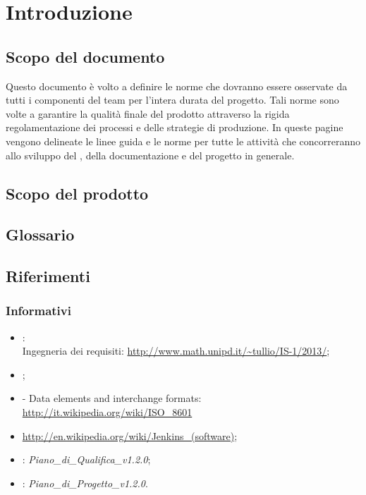 \newpage
\section{Introduzione}%
\label{1.0}
\subsection{Scopo del documento}%
\label{1.1}
Questo documento è volto a definire le norme che dovranno essere osservate da tutti i componenti del team per l'intera durata del progetto. Tali norme sono volte a garantire la qualità finale del prodotto attraverso la rigida regolamentazione dei processi e delle strategie di produzione. In queste pagine vengono delineate le linee guida e le norme per tutte le attività che concorreranno allo sviluppo del , della documentazione e del progetto in generale.

\subsection{Scopo del prodotto}
\label{1.2}
\Prodotto{}

\subsection{Glossario}%
\label{1.3}
\Glossario{}

\subsection{Riferimenti} %
\label{1.4}
\subsubsection{Informativi}
\begin{itemize}
\item {}:\\
Ingegneria dei requisiti: \url{http://www.math.unipd.it/~tullio/IS-1/2013/};
\item {};\\
\item {} - Data elements and interchange formats: \url{http://it.wikipedia.org/wiki/ISO\_8601}
\item {} \url{http://en.wikipedia.org/wiki/Jenkins_(software)};
\item {}: \emph{Piano\_di\_Qualifica\_v1.2.0};
\item {}: \emph{Piano\_di\_Progetto\_v1.2.0}.
\end{itemize}

